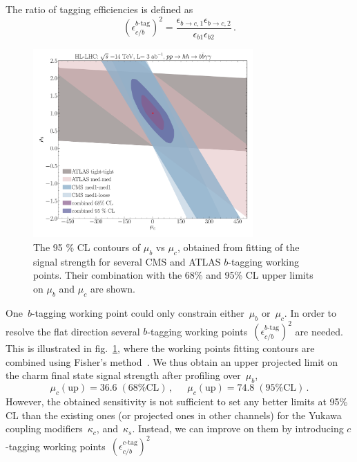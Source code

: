 The ratio of tagging efficiencies is defined as
\begin{equation}
	\left( \epsilon_{c/b}^{\text{$b$-tag}}\right)^2 = \frac{\epsilon_{b\to c,1}  \epsilon_{b\to c,2} }{\epsilon_{b1} \epsilon_{b2}}\,.
\end{equation}
\par
\begin{figure}[!ht]
	\centering
	\includegraphics[width = 0.75\textwidth]{./fig/muc_mub_unellepse}
	\caption{The  95 \% CL contours of $\mu_b$ vs $\mu_c$, obtained from fitting of the signal strength for several CMS and ATLAS $b$-tagging working points. Their combination with the 68\% and 95\% CL upper limits on $\mu_b$ and $\mu_c$ are shown.}
	\label{bworkingpoints}
\end{figure}
One~$b$-tagging working point could only constrain either~$ \mu_b$ or~$\mu_c$. In order to resolve the flat direction several $b$-tagging working points~$\left(\epsilon_{c/b}^{\text{$b$-tag}} \right)^2$ are needed. This is illustrated in fig.~\ref{bworkingpoints}, where the working points fitting contours are combined  using Fisher's method~\cite{heard2018choosing}. We thus obtain an upper projected limit on the charm final state signal strength after profiling over~$\mu_b$,
\begin{equation}
	\mu_c(\mathrm{up}) = 36.6 \;(\text{68\% CL})\,, \, \;\;\;\; \,  \mu_c(\mathrm{up}) = 74.8 \;(\text{95\% CL})\,.
\end{equation}
However, the obtained sensitivity is not sufficient to set any better limits at 95\% CL than the existing ones (or projected ones in other  channels) for the Yukawa coupling modifiers~$\kappa_c$, and~$\kappa_s$. Instead, we can improve on them by introducing $c$-tagging working points~$(\epsilon_{c/b}^{\text{$c$-tag}})^2$
